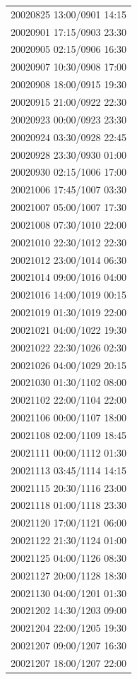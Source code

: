 \documentclass[linenumbers,draft]{agujournal}
\begin{document}
\begin{center}
\begin{longtable}{c}
20020825 13:00/0901 14:15 \\ 
20020901 17:15/0903 23:30 \\ 
20020905 02:15/0906 16:30 \\ 
20020907 10:30/0908 17:00 \\ 
20020908 18:00/0915 19:30 \\ 
20020915 21:00/0922 22:30 \\ 
20020923 00:00/0923 23:30 \\
20020924 03:30/0928 22:45 \\ 
20020928 23:30/0930 01:00 \\
20020930 02:15/1006 17:00 \\ 
20021006 17:45/1007 03:30 \\
20021007 05:00/1007 17:30 \\
20021008 07:30/1010 22:00 \\ 
20021010 22:30/1012 22:30 \\
20021012 23:00/1014 06:30 \\
20021014 09:00/1016 04:00 \\ 
20021016 14:00/1019 00:15 \\ 
20021019 01:30/1019 22:00 \\
20021021 04:00/1022 19:30 \\
20021022 22:30/1026 02:30 \\
20021026 04:00/1029 20:15 \\
20021030 01:30/1102 08:00 \\
20021102 22:00/1104 22:00 \\
20021106 00:00/1107 18:00 \\
20021108 02:00/1109 18:45 \\
20021111 00:00/1112 01:30 \\
20021113 03:45/1114 14:15 \\
20021115 20:30/1116 23:00 \\
20021118 01:00/1118 23:30 \\
20021120 17:00/1121 06:00 \\
20021122 21:30/1124 01:00 \\
20021125 04:00/1126 08:30 \\
20021127 20:00/1128 18:30 \\
20021130 04:00/1201 01:30 \\
20021202 14:30/1203 09:00 \\
20021204 22:00/1205 19:30 \\
20021207 09:00/1207 16:30 \\
20021207 18:00/1207 22:00 \\

\end{longtable}
\end{center}
\end{document}
